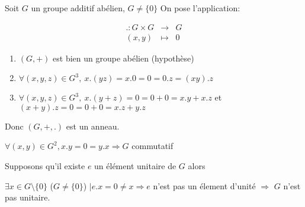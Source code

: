 
Soit $G$ un groupe additif abélien, $G \neq \{0\}$
On pose l'application:

\[
\begin{array}{rcl}
    . : G \times G & \to & G \\
    (x, y) & \mapsto & 0
\end{array}
\]

\begin{enumerate}
  \item $(G, +)$ est bien un groupe abélien (hypothèse)
  \item $\forall (x, y, z) \in G^3,\ x.(yz) = x.0 = 0 = 0.z = (xy).z$
  \item $\forall (x, y, z) \in G^3,\ x.(y + z) = 0 = 0 + 0 = x.y + x.z$ et $(x + y).z = 0 = 0 + 0 = x.z + y.z$
\end{enumerate}

Donc $(G, +, .)$ est un anneau.
\newline

$\forall (x, y) \in G^2, x.y = 0 = y.x \Rightarrow  G$ commutatif
\newline

Supposons qu'il existe $e$ un élément unitaire de $G$ alors

$\exists x \in G \setminus \{0\}$ ($G \neq \{0\}$) $| e.x = 0 \neq x \Rightarrow e $ n'est pas un élement d'unité $\Longrightarrow$ $G$ n'est pas unitaire.
